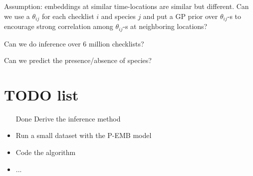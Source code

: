 \documentclass{article}
\begin{document}
Assumption: embeddings at similar time-locations are similar but different. Can we use a $\theta_{ij}$ for each checklist $i$ and species $j$ and put a GP prior over $\theta_{ij}$-s to encourage strong correlation among $\theta_{ij}$-s at neighboring locations?  

Can we do inference over 6 million checklists?

Can we predict the presence/absence of species?

\section{TODO list}
\begin{itemize}
\item [Done] Derive the inference method
\item Run a small dataset with the P-EMB model
\item Code the algorithm
\item ...
\end{itemize}
\end{document}
